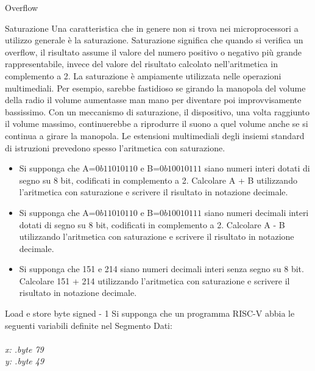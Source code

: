 \documentclass[11pt]{article}
\begin{document}
\begin{quiz}{Overflow}
\begin{cloze}[points=1,shuffle=false]{Saturazione}
Una caratteristica che in genere non si trova nei microprocessori a utilizzo generale è la saturazione. Saturazione significa che quando si verifica un overflow, il risultato assume il valore del numero positivo o negativo più grande rappresentabile, invece del valore del risultato calcolato nell'aritmetica in complemento a 2. La saturazione è ampiamente utilizzata nelle operazioni multimediali. Per esempio, sarebbe fastidioso se girando la manopola del volume della radio il volume aumentasse man mano per diventare poi improvvisamente bassissimo. Con un meccanismo di saturazione, il dispositivo, una volta raggiunto il volume massimo, continuerebbe a riprodurre il suono a quel volume anche se si
continua a girare la manopola. Le estensioni multimediali degli insiemi standard di istruzioni prevedono spesso l'aritmetica con saturazione.

\begin{itemize}
    \item Si supponga che A=$0b11010110$ e B=$0b10010111$ siano numeri interi dotati di segno su 8 bit, codificati in complemento a 2. Calcolare A + B utilizzando l'aritmetica con saturazione e scrivere il risultato in notazione decimale.
    \item Si supponga che A=$0b11010110$ e B=$0b10010111$ siano numeri decimali interi dotati di segno su 8 bit, codificati in complemento a 2. Calcolare A - B utilizzando l'aritmetica con saturazione e scrivere il risultato in notazione decimale.
    \item Si supponga che 151 e 214 siano numeri decimali interi senza segno su 8 bit. Calcolare 151 + 214 utilizzando l'aritmetica con saturazione e scrivere il risultato in notazione decimale.
\end{itemize}
\end{cloze}

\begin{cloze}[points=1,shuffle=true]{Load e store byte signed - 1}
    Si supponga che un programma RISC-V abbia le seguenti variabili definite nel Segmento Dati:\\\\
    \emph{
        x: .byte 79 \\
        y: .byte 49 \\
    }\\\\
        

\end{cloze}
\end{quiz}
\end{document}
